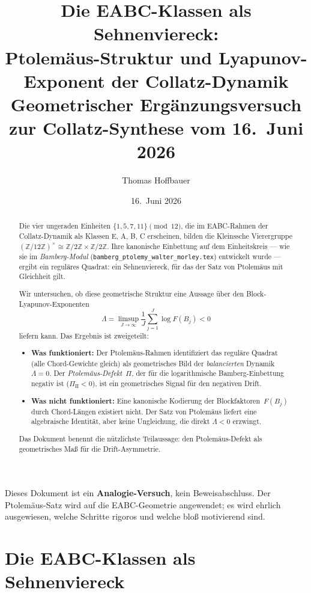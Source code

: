 \documentclass[12pt,a4paper]{article}
\title{%
  Die EABC-Klassen als Sehnenviereck:\\[0.3em]
  Ptolemäus-Struktur und Lyapunov-Exponent der Collatz-Dynamik\\[0.5em]
  \large Geometrischer Ergänzungsversuch zur Collatz-Synthese vom 16.\ Juni 2026%
}
\author{Thomas Hoffbauer}
\date{16.\ Juni 2026}
\newcommand{\Z}{\mathbb{Z}}
\newcommand{\Ptol}{\Pi}             %
\begin{document}
\maketitle

\begin{abstract}
Die vier ungeraden Einheiten $\{1,5,7,11\} \pmod{12}$, die im EABC-Rahmen
der Collatz-Dynamik als Klassen E, A, B, C erscheinen, bilden die Kleinssche
Vierergruppe $(\Z/12\Z)^\times \cong \Z/2\Z \times \Z/2\Z$.
Ihre kanonische Einbettung auf dem Einheitskreis --- wie sie im
\emph{Bamberg-Modul} (\texttt{bamberg\_ptolemy\_walter\_morley.tex}) entwickelt
wurde --- ergibt ein reguläres Quadrat: ein Sehnenviereck, für das der
Satz von Ptolemäus mit Gleichheit gilt.

Wir untersuchen, ob diese geometrische Struktur eine Aussage über den
Block-Lyapunov-Exponenten
\[
  \Lambda = \limsup_{J\to\infty} \frac{1}{J}\sum_{j=1}^J \log F(B_j) < 0
\]
liefern kann. Das Ergebnis ist zweigeteilt:
\begin{itemize}[leftmargin=*]
  \item \textbf{Was funktioniert:} Der Ptolemäus-Rahmen identifiziert das
    reguläre Quadrat (alle Chord-Gewichte gleich) als geometrisches Bild
    der \emph{balancierten} Dynamik~$\Lambda = 0$. Der
    \emph{Ptolemäus-Defekt}~$\Ptol$, der für die logarithmische
    Bamberg-Einbettung negativ ist ($\Ptol_{\mathrm{II}} < 0$),
    ist ein geometrisches Signal für den negativen Drift.
  \item \textbf{Was nicht funktioniert:} Eine kanonische Kodierung der
    Blockfaktoren~$F(B_j)$ durch Chord-Längen existiert nicht. Der Satz
    von Ptolemäus liefert eine algebraische Identität, aber keine
    Ungleichung, die direkt $\Lambda < 0$ erzwingt.
\end{itemize}
Das Dokument benennt die nützlichste Teilaussage: den Ptolemäus-Defekt
als geometrisches Maß für die Drift-Asymmetrie.
\end{abstract}

\tableofcontents

\bigskip
\begin{tcolorbox}[warnung, title={Einordnung}]
Dieses Dokument ist ein \textbf{Analogie-Versuch}, kein Beweisabschluss.
Der Ptolemäus-Satz wird auf die EABC-Geometrie angewendet; es wird
ehrlich ausgewiesen, welche Schritte rigoros und welche bloß
motivierend sind.
\end{tcolorbox}

\section{Die EABC-Klassen als Sehnenviereck}
\label{sec:sehnenviereck}
\end{document}
